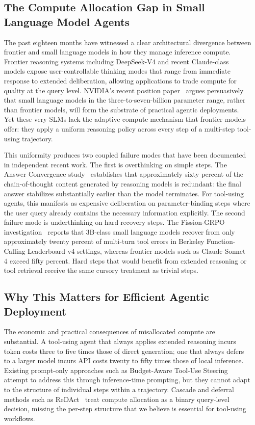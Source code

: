 \documentclass[11pt,a4paper]{article}
\begin{document}
\subsection{The Compute Allocation Gap in Small Language Model Agents}

The past eighteen months have witnessed a clear architectural divergence between frontier and small language models in how they manage inference compute. Frontier reasoning systems including DeepSeek-V4 and recent Claude-class models expose user-controllable thinking modes that range from immediate response to extended deliberation, allowing applications to trade compute for quality at the query level. NVIDIA's recent position paper~\cite{nvidia_slm_position} argues persuasively that small language models in the three-to-seven-billion parameter range, rather than frontier models, will form the substrate of practical agentic deployments. Yet these very SLMs lack the adaptive compute mechanism that frontier models offer: they apply a uniform reasoning policy across every step of a multi-step tool-using trajectory.

This uniformity produces two coupled failure modes that have been documented in independent recent work. The first is overthinking on simple steps. The Answer Convergence study~\cite{answer_convergence} establishes that approximately sixty percent of the chain-of-thought content generated by reasoning models is redundant: the final answer stabilizes substantially earlier than the model terminates. For tool-using agents, this manifests as expensive deliberation on parameter-binding steps where the user query already contains the necessary information explicitly. The second failure mode is underthinking on hard recovery steps. The Fission-GRPO investigation~\cite{fission_grpo} reports that 3B-class small language models recover from only approximately twenty percent of multi-turn tool errors in Berkeley Function-Calling Leaderboard v4 settings, whereas frontier models such as Claude Sonnet 4 exceed fifty percent. Hard steps that would benefit from extended reasoning or tool retrieval receive the same cursory treatment as trivial steps.

\subsection{Why This Matters for Efficient Agentic Deployment}

The economic and practical consequences of misallocated compute are substantial. A tool-using agent that always applies extended reasoning incurs token costs three to five times those of direct generation; one that always defers to a larger model incurs API costs twenty to fifty times those of local inference. Existing prompt-only approaches such as Budget-Aware Tool-Use Steering~\cite{bats} attempt to address this through inference-time prompting, but they cannot adapt to the structure of individual steps within a trajectory. Cascade and deferral methods such as ReDAct~\cite{redact} treat compute allocation as a binary query-level decision, missing the per-step structure that we believe is essential for tool-using workflows.
\end{document}
